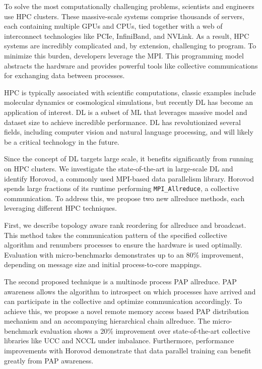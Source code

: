 
To solve the most computationally challenging problems, scientists and engineers use \gls{HPC} clusters. These massive-scale systems comprise thousands of servers, each containing multiple GPUs and CPUs, tied together with a web of interconnect technologies like PCIe, InfiniBand, and NVLink. As a result, \gls{HPC} systems are incredibly complicated and, by extension, challenging to program. To minimize this burden, developers leverage the \gls{MPI}. This programming model abstracts the hardware and provides powerful tools like collective communications for exchanging data between processes.

\gls{HPC} is typically associated with scientific computations, classic examples include molecular dynamics or cosmological simulations, but recently \gls{DL} has become an application of interest. \gls{DL} is a subset of \gls{ML} that leverages massive model and dataset size to achieve incredible performance. \gls{DL} has revolutionized several fields, including computer vision and natural language processing, and will likely be a critical technology in the future. 

Since the concept of \gls{DL} targets large scale, it benefits significantly from running on \gls{HPC} clusters. We investigate the state-of-the-art in large-scale \gls{DL} and identify Horovod, a commonly used \gls{MPI}-based data parallelism library. Horovod spends large fractions of its runtime performing \texttt{MPI\_Allreduce}, a collective communication. To address this, we propose two new allreduce methods, each leveraging different \gls{HPC} techniques. 

First, we describe topology aware rank reordering for allreduce and broadcast. This method takes the communication pattern of the specified collective algorithm and renumbers processes to ensure the hardware is used optimally. Evaluation with micro-benchmarks demonstrates up to an 80\% improvement, depending on message size and initial process-to-core mappings.

The second proposed technique is a multinode process \gls{PAP} allreduce. \gls{PAP} awareness allows the algorithm to introspect on which processes have arrived and can participate in the collective and optimize communication accordingly. To achieve this, we propose a novel remote memory access based \gls{PAP} distribution mechanism and an accompanying hierarchical chain allreduce. The micro-benchmark evaluation shows a 20\% improvement over state-of-the-art collective libraries like UCC and NCCL under imbalance. Furthermore, performance improvements with Horovod demonstrate that data parallel training can benefit greatly from \gls{PAP} awareness.